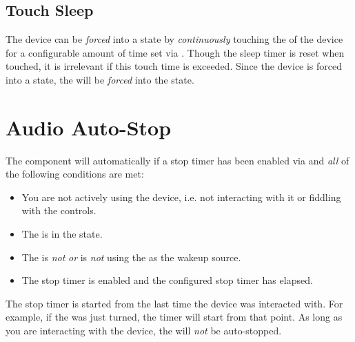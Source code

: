 \subsection{Touch Sleep} \label{Power - Touch}

The device can be \textit{forced} into a  state by
\textit{continuously} touching the  of the device for a configurable
amount of time set via \hyperref[Power Settings]{}.  Though the sleep
timer is reset when touched, it is irrelevant if this touch time is exceeded.
Since the device is forced into a  state, the  will be
\textit{forced} into the  state.


\section{Audio Auto-Stop} \label{Power - Stop}

The  component will automatically  if a stop timer has been
enabled via \hyperref[Power Settings]{} and \textit{all} of the
following conditions are met:

\begin{itemize}
  \item You are not actively using the device, i.e. not interacting with it or
    fiddling with the controls.
  \item The  is in the  state.
  \item The  is \textit{not}  \textit{or} is \textit{not} using
    the  as the wakeup source.
  \item The stop timer is enabled and the configured stop timer has elapsed.
\end{itemize}

The stop timer is started from the last time the device was interacted with.
For example, if the  was just turned, the timer will start from that
point.  As long as you are interacting with the device, the  will
\textit{not} be auto-stopped.

